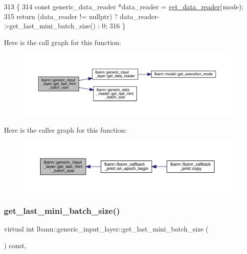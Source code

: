 \begin{DoxyCode}
313                                                                   \{
314     \textcolor{keyword}{const} generic\_data\_reader *data\_reader = \hyperlink{classlbann_1_1generic__input__layer_aba732becdb02627e3ad4493ac19e8fb6}{get\_data\_reader}(mode);
315     \textcolor{keywordflow}{return} (data\_reader != \textcolor{keyword}{nullptr}) ? data\_reader->get\_last\_mini\_batch\_size() : 0;
316   \}
\end{DoxyCode}
Here is the call graph for this function\+:\nopagebreak
\begin{figure}[H]
\begin{center}
\leavevmode
\includegraphics[width=350pt]{classlbann_1_1generic__input__layer_a5e3c66c5726ab4a00d75bdcd2c07b640_cgraph}
\end{center}
\end{figure}
Here is the caller graph for this function\+:\nopagebreak
\begin{figure}[H]
\begin{center}
\leavevmode
\includegraphics[width=350pt]{classlbann_1_1generic__input__layer_a5e3c66c5726ab4a00d75bdcd2c07b640_icgraph}
\end{center}
\end{figure}
\mbox{\label{classlbann_1_1generic__input__layer_aebca4bd6660ee5b7f99129bd84ed4f8d}} 
\subsubsection{\texorpdfstring{get\+\_\+last\+\_\+mini\+\_\+batch\+\_\+size()}{get\_last\_mini\_batch\_size()}\hspace{0.1cm}{\footnotesize\ttfamily [2/2]}}
{\footnotesize\ttfamily virtual int lbann\+::generic\+\_\+input\+\_\+layer\+::get\+\_\+last\+\_\+mini\+\_\+batch\+\_\+size (\begin{DoxyParamCaption}{ }\end{DoxyParamCaption}) const\hspace{0.3cm}{\ttfamily [inline]}, {\ttfamily [virtual]}}



